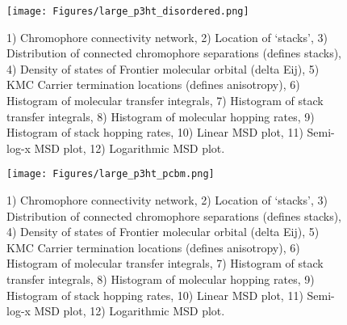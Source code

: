 \documentclass[12pt]{article}
\begin{document}
\begin{figure}[h]\centering
	\texttt{[image: Figures/large\_p3ht\_disordered.png]}
    \caption{   1) Chromophore connectivity network, 
                2) Location of `stacks', 
                3) Distribution of connected chromophore separations (defines stacks),
                4) Density of states of Frontier molecular orbital (delta Eij),
                5) KMC Carrier termination locations (defines anisotropy),
                6) Histogram of molecular transfer integrals,
                7) Histogram of stack transfer integrals,
                8) Histogram of molecular hopping rates,
                9) Histogram of stack hopping rates,
                10) Linear MSD plot,
                11) Semi-log-x MSD plot,
                12) Logarithmic MSD plot.}
	\label{fig:largeDisordered}
\end{figure}


\begin{figure}[h]\centering
	\texttt{[image: Figures/large\_p3ht\_pcbm.png]}
    \caption{   1) Chromophore connectivity network, 
                2) Location of `stacks', 
                3) Distribution of connected chromophore separations (defines stacks),
                4) Density of states of Frontier molecular orbital (delta Eij),
                5) KMC Carrier termination locations (defines anisotropy),
                6) Histogram of molecular transfer integrals,
                7) Histogram of stack transfer integrals,
                8) Histogram of molecular hopping rates,
                9) Histogram of stack hopping rates,
                10) Linear MSD plot,
                11) Semi-log-x MSD plot,
                12) Logarithmic MSD plot.}
	\label{fig:largePCBM}
\end{figure}




\end{document}
